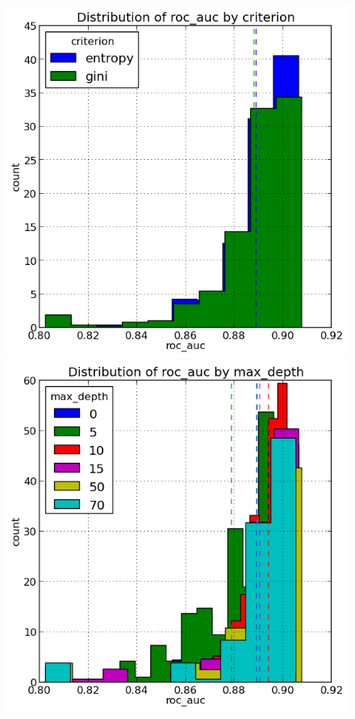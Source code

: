\documentclass[final,3p,times,twocolumn]{elsarticle}
\begin{document}
\begin{figure}
\includegraphics[scale=0.5]{Images/roc_auc_criterion.png}
\includegraphics[scale=0.5]{Images/roc_auc_max_depth.png}

\end{figure}
\end{document}
